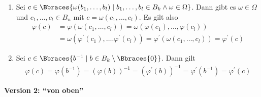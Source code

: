 \begin{solution}
\begin{enumerate}[label = (\roman*)]
\begin{enumerate}[label = Fall \arabic*:]
            \item Sei $c \in \Bbraces{\omega(b_1, \dots, b_l) \mid b_1, \dots, b_l \in B_k \land \omega \in \Omega}$. Dann gibt es $\omega \in \Omega$ und $c_1, \dots, c_l \in B_n$ mit $c = \omega(c_1, \dots, c_l)$. Es gilt also
            \begin{align*}
                \varphi(c) &= \varphi(\omega(c_1, \dots, c_l)) = \omega(\varphi(c_1), \dots, \varphi(c_l)) \\
                &= \omega(\varphi^\prime(c_1), \dots. \varphi^\prime(c_l)) = \varphi^\prime(\omega(c_1, \dots, c_l)) = \varphi^\prime(c)
            \end{align*}
            \item Sei $c \in \Bbraces{b^{-1} \mid b \in B_k \setminus \Bbraces{0}}$. Dann gilt
            \begin{align*}
                \varphi(c) = \varphi(b^{-1}) = (\varphi(b))^{-1} = (\varphi^\prime(b))^{-1} = \varphi^\prime(b^{-1}) = \varphi^\prime(c)
            \end{align*}
        \end{enumerate}
    \end{enumerate}
\end{solution}
\textbf{Version 2: ``von oben''} \\
